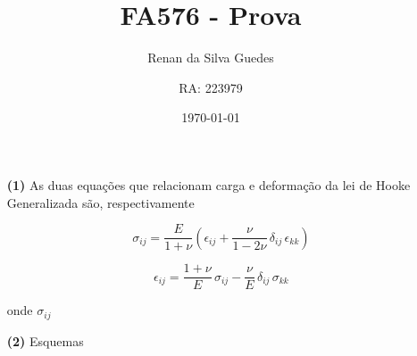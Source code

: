 \documentclass[a4paper, 12pt, brazilian]{article}
\title{FA576 - Prova}
\author{Renan da Silva Guedes \and RA: 223979}
\date{\today}
\begin{document}
	\maketitle
	\begin{itemize}
		\item[\textbf{(1)}] As duas equações que relacionam carga e deformação da lei de Hooke Generalizada são, respectivamente
		
		\begin{equation}
			\sigma_{ij}=\dfrac{E}{1+\nu}\left(\epsilon_{ij}+\dfrac{\nu}{1-2\nu}\,\delta_{ij}\,\epsilon_{kk}\right)
		\end{equation}
		
		\begin{equation}
			\epsilon_{ij}=\dfrac{1+\nu}{E}\,\sigma_{ij}-\dfrac{\nu}{E}\,\delta_{ij}\,\sigma_{kk}
		\end{equation}
		
		onde $\sigma_{ij}$
		
		\item[\textbf{(2)}] Esquemas
		

\end{itemize}
\end{document}
